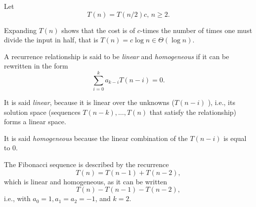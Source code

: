 \begin{eg}
    Let \[
    T(n) = T(n /2)  c,\, n\ge 2
    .\] 
    
    Expanding $T(n)$ shows that the cost is of $c$-times the number of times one must divide the input in half, that is $T(n) = c \log n\in \Theta(\log n)$.
\end{eg}

\begin{definition}
    A recurrence relationship is said to be \emph{linear} and \emph{homogeneous} if it can be rewritten in the form \[
    \sum_{i=0}^{k} a_{k-i}T(n-i) = 0
    .\] 
\end{definition}

It is said \emph{linear}, because it is linear over the unknowns ($T(n-i)$ ), i.e., its solution space (sequences $T(n-k),\ldots,T(n)$ that satisfy the relationship) forms a linear space.

It is said \emph{homogeneous} because the linear combination of the $T(n-i)$ is equal to $0$.

\begin{eg}
    The Fibonacci sequence is described by the recurrence \[
    T(n) = T(n-1) + T(n-2)
    ,\] which is linear and homogeneous, as it can be written \[
    T(n) - T(n-1) - T(n-2)
    ,\] i.e., with $a_0=1,a_1=a_2=-1$, and $k=2$.
\end{eg}

